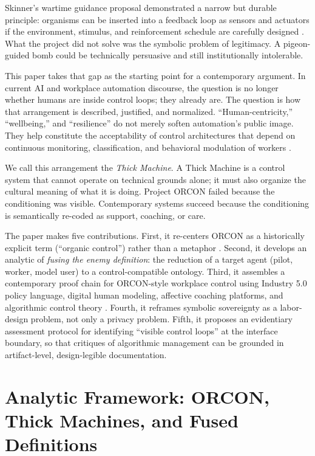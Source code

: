 \documentclass[runningheads]{llncs}
\begin{document}
Skinner's wartime guidance proposal demonstrated a narrow but durable principle: organisms can be inserted into a feedback loop as sensors and actuators if the environment, stimulus, and reinforcement schedule are carefully designed \cite{skinner1960pigeons,capshew1993engineering}. What the project did not solve was the symbolic problem of legitimacy. A pigeon-guided bomb could be technically persuasive and still institutionally intolerable.

This paper takes that gap as the starting point for a contemporary argument. In current AI and workplace automation discourse, the question is no longer whether humans are inside control loops; they already are. The question is how that arrangement is described, justified, and normalized. ``Human-centricity,'' ``wellbeing,'' and ``resilience'' do not merely soften automation's public image. They help constitute the acceptability of control architectures that depend on continuous monitoring, classification, and behavioral modulation of workers \cite{breque2021industry,kellogg2020algorithms}.

We call this arrangement the \emph{Thick Machine}. A Thick Machine is a control system that cannot operate on technical grounds alone; it must also organize the cultural meaning of what it is doing. Project ORCON failed because the conditioning was visible. Contemporary systems succeed because the conditioning is semantically re-coded as support, coaching, or care.

The paper makes five contributions. First, it re-centers ORCON as a historically explicit term (``organic control'') rather than a metaphor \cite{skinner1960pigeons}. Second, it develops an analytic of \emph{fusing the enemy definition}: the reduction of a target agent (pilot, worker, model user) to a control-compatible ontology. Third, it assembles a contemporary proof chain for ORCON-style workplace control using Industry 5.0 policy language, digital human modeling, affective coaching platforms, and algorithmic control theory \cite{breque2021industry,siemensPSXHuman,siemensHumanAdvanced,cxtoday2022cogito,kellogg2020algorithms}. Fourth, it reframes symbolic sovereignty as a labor-design problem, not only a privacy problem. Fifth, it proposes an evidentiary assessment protocol for identifying ``visible control loops'' at the interface boundary, so that critiques of algorithmic management can be grounded in artifact-level, design-legible documentation.

\section{Analytic Framework: ORCON, Thick Machines, and Fused Definitions}
\end{document}
